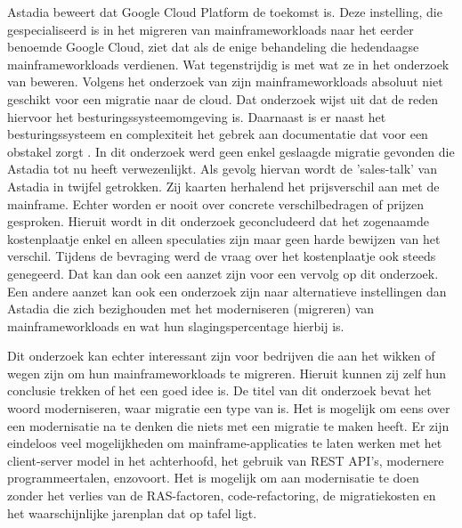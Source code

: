 Astadia beweert dat Google Cloud Platform de toekomst is. Deze instelling, die gespecialiseerd is in het migreren van mainframeworkloads naar het eerder benoemde Google Cloud, ziet dat als de enige behandeling die hedendaagse mainframeworkloads verdienen. Wat tegenstrijdig is met wat ze in het onderzoek van \textcite{Allison2016} beweren.  Volgens het onderzoek van \textcite{Allison2016} zijn mainframeworkloads absoluut niet geschikt voor een migratie naar de cloud. Dat onderzoek wijst uit dat de reden hiervoor het besturingssysteemomgeving is. Daarnaast is er naast het besturingssysteem en complexiteit het gebrek aan documentatie dat voor een obstakel zorgt \autocite{Zachry2001}. In dit onderzoek werd geen enkel geslaagde migratie gevonden die Astadia tot nu heeft verwezenlijkt. Als gevolg hiervan wordt de 'sales-talk' van Astadia in twijfel getrokken. Zij kaarten herhalend het prijsverschil aan met de mainframe. Echter worden er nooit over concrete verschilbedragen of prijzen gesproken. Hieruit wordt in dit onderzoek geconcludeerd dat het zogenaamde kostenplaatje enkel en alleen speculaties zijn maar geen harde bewijzen van het verschil. Tijdens de bevraging werd de vraag over het kostenplaatje ook steeds genegeerd. Dat kan dan ook een aanzet zijn voor een vervolg op dit onderzoek. Een andere aanzet kan ook een onderzoek zijn naar alternatieve instellingen dan Astadia die zich bezighouden met het moderniseren (migreren) van mainframeworkloads en wat hun slagingspercentage hierbij is. 

Dit onderzoek kan echter interessant zijn voor bedrijven die aan het wikken of wegen zijn om hun mainframeworkloads te migreren. Hieruit kunnen zij zelf hun conclusie trekken of het een goed idee is. De titel van dit onderzoek bevat het woord moderniseren, waar migratie een type van is. Het is mogelijk om eens over een modernisatie na te denken die niets met een migratie te maken heeft. Er zijn eindeloos veel mogelijkheden om mainframe-applicaties te laten werken met het client-server model in het achterhoofd, het gebruik van REST API's, modernere programmeertalen, enzovoort. Het is mogelijk om aan modernisatie te doen zonder het verlies van de RAS-factoren, code-refactoring, de migratiekosten en het waarschijnlijke jarenplan dat op tafel ligt. 




